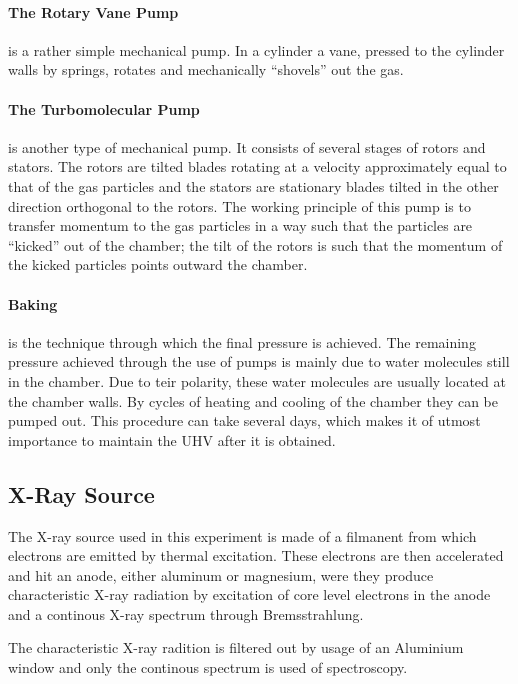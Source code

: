 \documentclass[a4paper,10pt]{scrartcl}
\begin{document}
\paragraph{The Rotary Vane Pump} is a rather simple mechanical pump. In a cylinder a vane, pressed to the cylinder walls by springs, rotates and mechanically ``shovels'' out the gas.

\paragraph{The Turbomolecular Pump} is another type of mechanical pump. It consists of several stages of rotors and stators. The rotors are tilted blades rotating at a velocity approximately equal to that of the gas particles and the stators are stationary blades tilted in the other direction orthogonal to the rotors. The working principle of this pump is to transfer momentum to the gas particles in a way such that the particles are ``kicked'' out of the chamber; the tilt of the rotors is such that the momentum of the kicked particles points outward the chamber.

\paragraph{Baking} is the technique through which the final pressure is achieved. The remaining pressure achieved through the use of pumps is mainly due to water molecules still in the chamber. Due to teir polarity, these water molecules are usually located at the chamber walls. By cycles of heating and cooling of the chamber they can be pumped out. This procedure can take several days, which makes it of utmost importance to maintain the UHV after it is obtained.

\subsection{X-Ray Source}

The X-ray source used in this experiment is made of a filmanent from which electrons are emitted by thermal excitation. These electrons are then accelerated and hit an anode, either aluminum or magnesium, were they produce characteristic X-ray radiation by excitation of core level electrons in the anode and a continous X-ray spectrum through Bremsstrahlung.

The characteristic X-ray radition is filtered out by usage of an Aluminium window and only the continous spectrum is used of spectroscopy.
\end{document}
